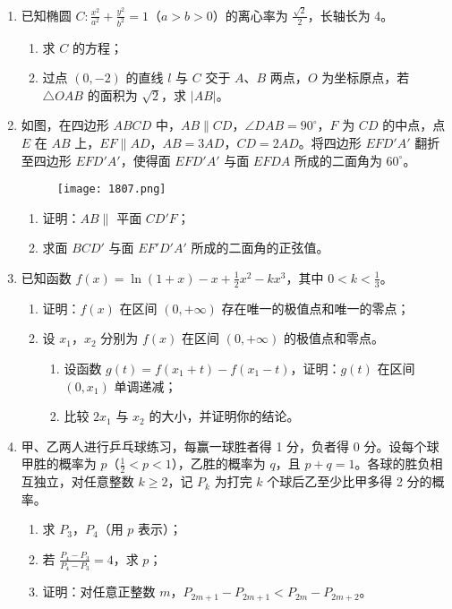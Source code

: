 \documentclass[UTF8]{ctexart}
\begin{document}
\begin{enumerate}[leftmargin=*, label=\textbf{\arabic*.}]
		\item 已知椭圆 $ C: \frac{x^2}{a^2} + \frac{y^2}{b^2} = 1 $（$ a > b > 0 $）的离心率为 $ \frac{\sqrt{2}}{2} $，长轴长为 4。
		\begin{enumerate}[label=(\roman*)]
			\item 求 $ C $ 的方程；
			\item 过点 $ (0, -2) $ 的直线 $ l $ 与 $ C $ 交于 $ A $、$ B $ 两点，$ O $ 为坐标原点，若 $ \triangle OAB $ 的面积为 $ \sqrt{2} $，求 $ |AB| $。
		\end{enumerate}
		
		\item 如图，在四边形 $ ABCD $ 中，$ AB \parallel CD $，$ \angle DAB = 90^\circ $，$ F $ 为 $ CD $ 的中点，点 $ E $ 在 $ AB $ 上，$ EF \parallel AD $，$ AB = 3AD $，$ CD = 2AD $。将四边形 $ EFD'A' $ 翻折至四边形 $ EFD'A' $，使得面 $ EFD'A' $ 与面 $ EFDA $ 所成的二面角为 $ 60^\circ $。
		\begin{figure}[h]
			\centering
			\texttt{[image: 1807.png]} %
		\end{figure}
		\begin{enumerate}[label=(\roman*)]
			\item 证明：$ AB \parallel $ 平面 $ CD'F $；
			\item 求面 $ BCD' $ 与面 $ EF'D'A' $ 所成的二面角的正弦值。
		\end{enumerate}
		
		\item 已知函数 $ f(x) = \ln(1 + x) - x + \frac{1}{2}x^2 - kx^3 $，其中 $ 0 < k < \frac{1}{3} $。
		\begin{enumerate}[label=(\roman*)]
			\item 证明：$ f(x) $ 在区间 $ (0, +\infty) $ 存在唯一的极值点和唯一的零点；
			\item 设 $ x_1 $，$ x_2 $ 分别为 $ f(x) $ 在区间 $ (0, +\infty) $ 的极值点和零点。
			\begin{enumerate}[label=(\alph*)]
				\item 设函数 $ g(t) = f(x_1 + t) - f(x_1 - t) $，证明：$ g(t) $ 在区间 $ (0, x_1) $ 单调递减；
				\item 比较 $ 2x_1 $ 与 $ x_2 $ 的大小，并证明你的结论。
			\end{enumerate}
		\end{enumerate}
		
		\item 甲、乙两人进行乒乓球练习，每赢一球胜者得 1 分，负者得 0 分。设每个球甲胜的概率为 $ p $（$ \frac{1}{2} < p < 1 $），乙胜的概率为 $ q $，且 $ p + q = 1 $。各球的胜负相互独立，对任意整数 $ k \geq 2 $，记 $ P_k $ 为打完 $ k $ 个球后乙至少比甲多得 2 分的概率。
		\begin{enumerate}[label=(\roman*)]
			\item 求 $ P_3 $，$ P_4 $（用 $ p $ 表示）；
			\item 若 $ \frac{P_4 - P_3}{P_4 - P_3} = 4 $，求 $ p $；
			\item 证明：对任意正整数 $ m $，$ P_{2m+1} - P_{2m+1} < P_{2m} - P_{2m+2} $。
		\end{enumerate}
	

\end{enumerate}
\end{document}
